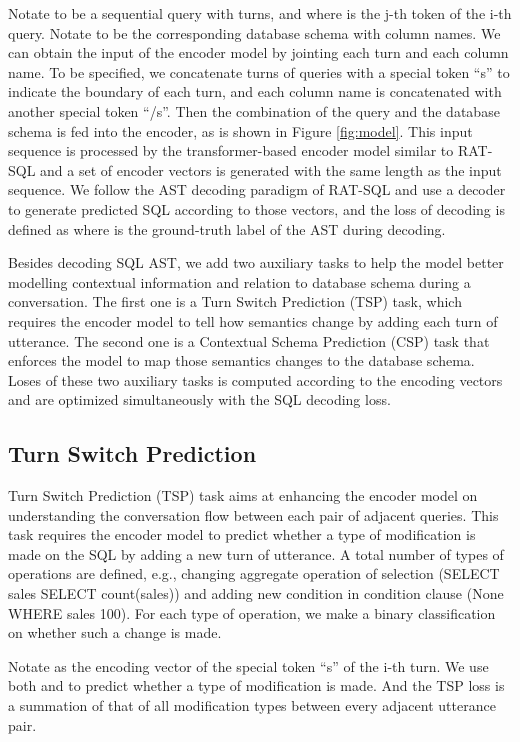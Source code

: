 \documentclass[a4paper]{article}
\begin{document}
Notate  to be a sequential query with  turns, and  where  is the j-th token of the i-th query. Notate  to be the corresponding database schema with column names. We can obtain the input of the encoder model by jointing each turn and each column name. To be specified, we concatenate turns of queries with a special token ``s'' to indicate the boundary of each turn, and each column name is concatenated with another special token ``/s''. Then the combination of the query and the database schema is fed into the encoder, as is shown in Figure \ref{fig:model}. This input sequence is processed by the transformer-based encoder model similar to RAT-SQL and a set of encoder vectors is generated with the same length as the input sequence. We follow the AST decoding paradigm of RAT-SQL and use a decoder to generate predicted SQL according to those vectors, and the loss of decoding is defined as
 where  is the ground-truth label of the AST during decoding.

Besides decoding SQL AST, we add two auxiliary tasks to help the model better modelling contextual information and relation to database schema during a conversation. The first one is a Turn Switch Prediction (TSP) task, which requires the encoder model to tell how semantics change by adding each turn of utterance. The second one is a Contextual Schema Prediction (CSP) task that enforces the model to map those semantics changes to the database schema. Loses of these two auxiliary tasks is computed according to the encoding vectors and are optimized simultaneously with the SQL decoding loss.


\subsection{Turn Switch Prediction}

Turn Switch Prediction (TSP) task aims at enhancing the encoder model on understanding the conversation flow between each pair of adjacent queries. This task requires the encoder model to predict whether a type of modification is made on the SQL by adding a new turn of utterance. A total number of  types of operations are defined, e.g., changing aggregate operation of selection (SELECT sales  SELECT count(sales)) and adding new condition in condition clause (None  WHERE sales  100). For each type of operation, we make a binary classification on whether such a change is made.

Notate  as the encoding vector of the special token ``s'' of the i-th turn. We use both  and  to predict whether a type of modification is made. And the TSP loss is a summation of that of all modification types between every adjacent utterance pair.
\end{document}
